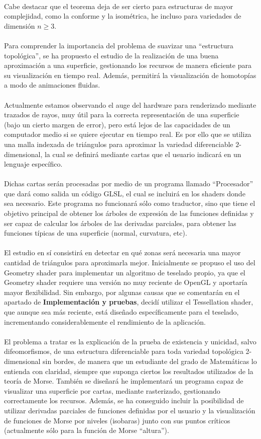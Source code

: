 \\Cabe destacar que el teorema deja de ser cierto para estructuras de mayor complejidad, como la conforme y la isométrica, he incluso para variedades de dimensión $n \geq 3$.\\
\\Para comprender la importancia del problema de suavizar una ``estructura topológica'', se ha propuesto el estudio de la realización de una buena aproximación a una superficie, gestionando los recursos de manera eficiente para su visualización en tiempo real. Además, permitirá la visualización de homotopías a modo de animaciones fluidas.\\
\\Actualmente estamos observando el auge del hardware para renderizado mediante trazados de rayos, muy útil para la correcta representación de una superficie (bajo un cierto margen de error), pero está lejos de las capacidades de un computador medio si se quiere ejecutar en tiempo real. Es por ello que se utiliza una malla indexada de triángulos para aproximar la variedad diferenciable $2$-dimensional, la cual se definirá mediante cartas que el usuario indicará en un lenguaje específico.\\
\\Dichas cartas serán procesadas por medio de un programa llamado ``Procesador'' que dará como salida un código GLSL, el cual se incluirá en los shaders donde sea necesario. Este programa no funcionará sólo como traductor, sino que tiene el objetivo principal de obtener los árboles de expresión de las funciones definidas y ser capaz de calcular los árboles de las derivadas parciales, para obtener las funciones típicas de una superficie (normal, curvatura, etc).\\
\\El estudio en sí consistirá en detectar en qué zonas será necesaria una mayor cantidad de triángulos para aproximarla mejor. Inicialmente se propuso el uso del Geometry shader para implementar un algoritmo de teselado propio, ya que el Geometry shader requiere una versión no muy reciente de OpenGL y aportaría mayor flexibilidad. Sin embargo, por algunas causas que se comentarán en el apartado de \textbf{Implementación y pruebas}, decidí utilizar el Tessellation shader, que aunque sea más reciente, está diseñado específicamente para el teselado, incrementando considerablemente el rendimiento de la aplicación.\\
\\El problema a tratar es la explicación de la prueba de existencia y unicidad, salvo difeomorfismos, de una estructura diferenciable para toda variedad topológica 2-dimensional sin bordes, de manera que un estudiante del grado de Matemáticas lo entienda con claridad, siempre que suponga ciertos los resultados utilizados de la teoría de Morse. También se diseñará he implementará un programa capaz de visualizar una superficie por cartas, mediante rasterizado, gestionando correctamente los recursos. Además, se ha conseguido incluir la posibilidad de utilizar derivadas parciales de funciones definidas por el usuario y la visualización de funciones de Morse por niveles (isobaras) junto con sus puntos críticos (actualmente sólo para la función de Morse ``altura'').

